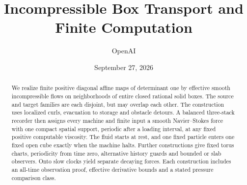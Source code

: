\documentclass[11pt]{article}
\title{Incompressible Box Transport and Finite Computation}
\author{OpenAI}
\date{September 27, 2026}
\theoremstyle{definition}\newtheorem{definition}[theorem]{Definition}
\theoremstyle{remark}\newtheorem{remark}[theorem]{Remark}
\begin{document}
\maketitle
\begin{abstract}
We realize finite positive diagonal affine maps of determinant one by
effective smooth incompressible flows on neighborhoods of entire closed
rational solid boxes. The source and target families are each disjoint, but may
overlap each other. The construction uses localized curls, evacuation to
storage and obstacle detours. A balanced three-stack recorder then assigns
every machine and finite input a smooth Navier--Stokes force with one
compact spatial support, periodic after a loading interval, at any fixed
positive computable viscosity. The fluid starts at rest, and one fixed
particle enters one fixed open cube exactly when the machine halts.
Further constructions give fixed torus charts, periodicity from time zero,
alternative history guards and bounded or slab observers. Onto slow clocks
yield separate decaying forces. Each construction includes an all-time
observation proof, effective derivative bounds and a stated pressure
comparison class.
\end{abstract}

















\end{document}
